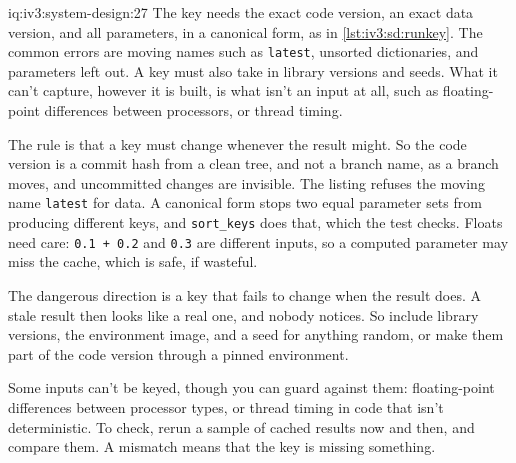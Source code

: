 \begin{solution}{iq:iv3:system-design:27}
The key needs the exact code version, an exact data version, and all parameters, in a canonical form, as in \cref{lst:iv3:sd:runkey}. The common errors are moving names such as \texttt{latest}, unsorted dictionaries, and parameters left out. A key must also take in library versions and seeds. What it can't capture, however it is built, is what isn't an input at all, such as floating-point differences between processors, or thread timing.
\label{lst:iv3:sd:runkey}

The rule is that a key must change whenever the result might. So the code version is a commit hash from a clean tree, and not a branch name, as a branch moves, and uncommitted changes are invisible. The listing refuses the moving name \texttt{latest} for data. A canonical form stops two equal parameter sets from producing different keys, and \texttt{sort\_keys} does that, which the test checks. Floats need care: \texttt{0.1 + 0.2} and \texttt{0.3} are different inputs, so a computed parameter may miss the cache, which is safe, if wasteful.

The dangerous direction is a key that fails to change when the result does. A stale result then looks like a real one, and nobody notices. So include library versions, the environment image, and a seed for anything random, or make them part of the code version through a pinned environment.

Some inputs can't be keyed, though you can guard against them: floating-point differences between processor types, or thread timing in code that isn't deterministic. To check, rerun a sample of cached results now and then, and compare them. A mismatch means that the key is missing something.

\end{solution}


